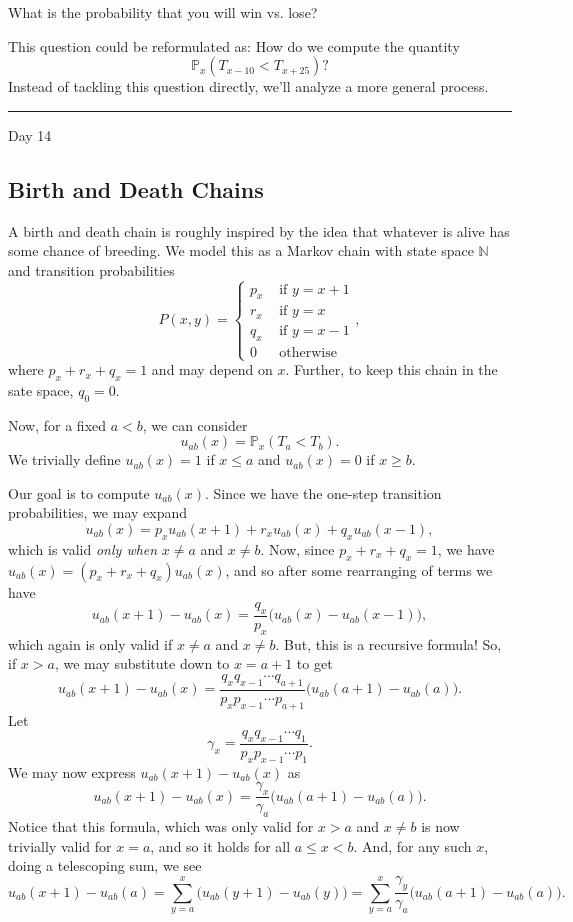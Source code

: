 \documentclass{problemset}
\newcommand{\N}{\mathbb{N}}
\newcommand{\1}{\mathbf{1}}
\renewcommand{\P}{\mathbb{P}}
\newcommand{\fatrule}[1]{\vspace{.3cm}\hrule {\hfill \sf #1}\par}
\begin{document}
	What is the probability that you will win vs\mbox{.} lose?

	This question could be reformulated as: How do we compute the quantity
	\[
		\P_x(T_{x-10} < T_{x+25})?
	\]
	Instead of tackling this question directly, we'll analyze a more general process.

	\fatrule{Day 14}
\subsection*{Birth and Death Chains}
	A birth and death chain is roughly inspired by the idea that whatever is alive
	has some chance of breeding.  We model this as a Markov chain with state space $\N$
	and transition probabilities
	\[
		P(x,y) = \begin{cases}
			p_x &\text{ if }y=x+1\\
			r_x &\text{ if }y=x\\
			q_x &\text{ if }y=x-1\\
			0 &\text{ otherwise }
		\end{cases},
	\]
	where $p_x+r_x+q_x=1$ and may depend on $x$.  Further, to keep this chain in the sate space, $q_0=0$.

	Now, for a fixed $a<b$, we can consider
	\[
		u_{ab}(x) = \P_x(T_a < T_b).
	\]
	We trivially define $u_{ab}(x) = 1$ if $x\leq a$ and $u_{ab}(x)=0$ if $x\geq b$.

	Our goal is to compute $u_{ab}(x)$.  Since we have the one-step transition
	probabilities, we may expand
	\[
		u_{ab}(x) = p_xu_{ab}(x+1)+r_xu_{ab}(x)+q_xu_{ab}(x-1),
	\]
	which is valid \emph{only when} $x\neq a$ and $x\neq b$.  Now, since $p_x+r_x+q_x=1$, 
	we have $u_{ab}(x)  = (p_x+r_x+q_x)u_{ab}(x)$, and so after some rearranging of terms
	we have
	\[
		u_{ab}(x+1)-u_{ab}(x) = \frac{q_x}{p_x}\Big(u_{ab}(x)-u_{ab}(x-1)\Big),
	\]
	which again is only valid if $x\neq a$ and $x\neq b$.  But, this is a recursive formula!
	So, if $x>a$, we may substitute down to $x=a+1$ to get
	\[
		u_{ab}(x+1)-u_{ab}(x) = \frac{q_xq_{x-1}\cdots q_{a+1}}{p_xp_{x-1}\cdots p_{a+1}}\Big(u_{ab}(a+1)-u_{ab}(a)\Big).
	\]
	Let
	\[
		\gamma_x = \frac{q_xq_{x-1}\cdots q_{1}}{p_xp_{x-1}\cdots p_{1}}.
	\]
	We may now express $u_{ab}(x+1)-u_{ab}(x)$ as
	\[
		u_{ab}(x+1)-u_{ab}(x) = \frac{\gamma_x}{\gamma_a}\Big(u_{ab}(a+1)-u_{ab}(a)\Big).
	\]
	Notice that this formula, which was only valid for $x> a$ and $x\neq b$ is now trivially valid for $x=a$, 
	and so it holds for all $a\leq x < b$.  And, for any such $x$, doing a telescoping sum, we see
	\[
		u_{ab}(x+1)-u_{ab}(a) = \sum_{y=a}^x \Big(u_{ab}(y+1)-u_{ab}(y)\Big) = \sum_{y=a}^x \frac{\gamma_y}{\gamma_a}\Big(u_{ab}(a+1)-u_{ab}(a)\Big).
	\]
\end{document}
